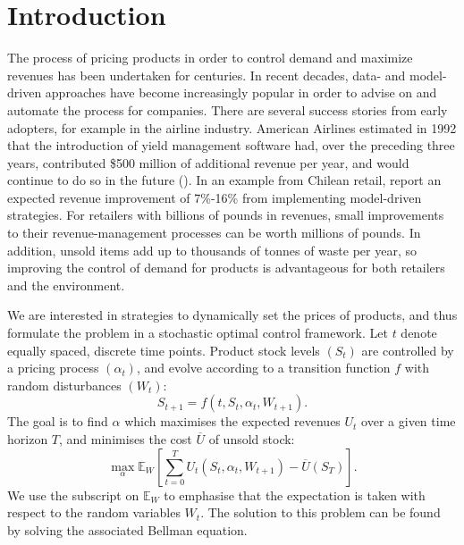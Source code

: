 \documentclass[main.tex]{subfiles}
\begin{document}
\listoftodos

\section{Introduction}
The process of pricing products in order to control demand and
maximize revenues has been undertaken for centuries. In recent
decades, data- and model-driven approaches have become increasingly
popular in order to advise on and automate the process for companies.
There are several success stories from early adopters, for example in
the airline industry. American Airlines estimated in 1992 that
the introduction of yield management software had, over the preceding
three years, contributed \$500 million of additional revenue per year,
and would continue to do so in the future (\citet{smith1992yield}).
In an example from Chilean retail, \citet{bitran1998coordinating}
report an expected revenue improvement of 7\%-16\% from implementing
model-driven strategies.
For retailers with billions of pounds in revenues, small
improvements to their revenue-management processes can be worth millions
of pounds.
In addition, unsold items add up to thousands of tonnes of waste per year, so
improving the control of demand for products is advantageous
for both retailers and the environment.

We are interested in strategies to dynamically set the prices of
products, and thus
formulate the problem in a stochastic optimal control framework.
Let $t$ denote equally spaced, discrete time points.
Product stock levels $(S_t)$ are controlled by a pricing process
$(\alpha_t)$, and evolve according to a transition function $f$ with random disturbances
$(W_t)$:
\begin{equation}
  S_{t+1}=f(t,S_t,\alpha_t,W_{t+1}).
\end{equation}
The goal is to find $\alpha$ which maximises the expected revenues $U_t$ over a
given time horizon $T$, and
minimises the cost $\overline{U}$ of unsold stock:
\begin{equation}
  \max_{\alpha}\mathbb E_W\left[ \sum_{t=0}^TU_t(S_t,\alpha_t,W_{t+1})
    - \overline{U}(S_T)\right].
\end{equation}
We use the subscript on $\mathbb E_W$ to emphasise that the
expectation is taken with respect to the random variables $W_t$.
The solution to this problem can be found by solving the associated
Bellman equation.
\end{document}

